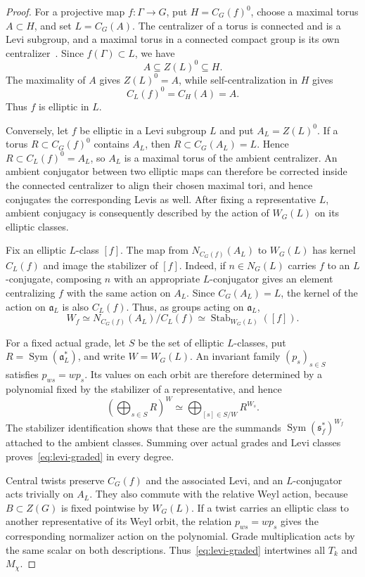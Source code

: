 \documentclass[11pt,a4paper,reqno]{amsart}
\theoremstyle{plain}
\theoremstyle{definition}
\theoremstyle{remark}
\numberwithin{equation}{section}
\DeclareMathOperator{\Sym}{Sym}
\DeclareMathOperator{\Stab}{Stab}
\newcommand{\fa}{\mathfrak a}
\begin{document}
\begin{proof}
For a projective map $f\colon\Gamma\to G$, put $H=C_G(f)^0$, choose a maximal torus $A\subset H$, and set $L=C_G(A)$. The centralizer of a torus is connected and is a Levi subgroup, and a maximal torus in a connected compact group is its own centralizer~\cite[15.14 and~23.13]{Milne}. Since $f(\Gamma)\subset L$, we have
\[
A\subseteq Z(L)^0\subseteq H.
\]
The maximality of $A$ gives $Z(L)^0=A$, while self-centralization in $H$ gives
\[
C_L(f)^0=C_H(A)=A.
\]
Thus $f$ is elliptic in $L$.

Conversely, let $f$ be elliptic in a Levi subgroup $L$ and put $A_L=Z(L)^0$. If a torus $R\subset C_G(f)^0$ contains $A_L$, then $R\subset C_G(A_L)=L$. Hence $R\subset C_L(f)^0=A_L$, so $A_L$ is a maximal torus of the ambient centralizer. An ambient conjugator between two elliptic maps can therefore be corrected inside the connected centralizer to align their chosen maximal tori, and hence conjugates the corresponding Levis as well. After fixing a representative $L$, ambient conjugacy is consequently described by the action of $W_G(L)$ on its elliptic classes.

Fix an elliptic $L$-class $[f]$. The map from $N_{C_G(f)}(A_L)$ to $W_G(L)$ has kernel $C_L(f)$ and image the stabilizer of $[f]$. Indeed, if $n\in N_G(L)$ carries $f$ to an $L$-conjugate, composing $n$ with an appropriate $L$-conjugator gives an element centralizing $f$ with the same action on $A_L$. Since $C_G(A_L)=L$, the kernel of the action on $\fa_L$ is also $C_L(f)$. Thus, as groups acting on $\fa_L$,
\[
W_f\simeq N_{C_G(f)}(A_L)/C_L(f)
\simeq\Stab_{W_G(L)}([f]).
\]

For a fixed actual grade, let $S$ be the set of elliptic $L$-classes, put $R=\Sym(\fa_L^*)$, and write $W=W_G(L)$. An invariant family $(p_s)_{s\in S}$ satisfies $p_{ws}=wp_s$. Its values on each orbit are therefore determined by a polynomial fixed by the stabilizer of a representative, and hence
\[
\left(\bigoplus_{s\in S}R\right)^W
\simeq\bigoplus_{[s]\in S/W}R^{W_s}.
\]
The stabilizer identification shows that these are the summands $\Sym(\mathfrak s_f^*)^{W_f}$ attached to the ambient classes. Summing over actual grades and Levi classes proves~\eqref{eq:levi-graded} in every degree.

Central twists preserve $C_G(f)$ and the associated Levi, and an $L$-conjugator acts trivially on $A_L$. They also commute with the relative Weyl action, because $B\subset Z(G)$ is fixed pointwise by $W_G(L)$. If a twist carries an elliptic class to another representative of its Weyl orbit, the relation $p_{ws}=wp_s$ gives the corresponding normalizer action on the polynomial. Grade multiplication acts by the same scalar on both descriptions. Thus~\eqref{eq:levi-graded} intertwines all $T_k$ and $M_\chi$.
\end{proof}
\end{document}
